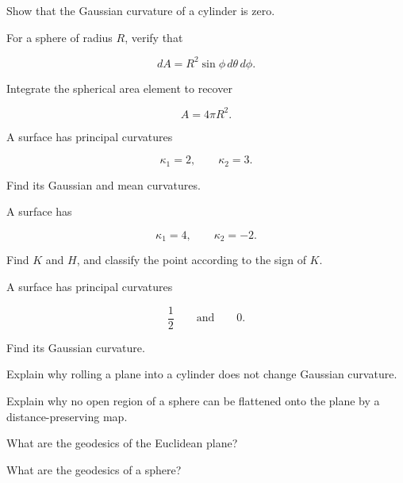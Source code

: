 \begin{exercise}[3]
Show that the Gaussian curvature of a cylinder is zero.
\end{exercise}

\begin{exercise}[2]
For a sphere of radius \(R\), verify that

\[
dA
=
R^2\sin\phi\,d\theta\,d\phi.
\]
\end{exercise}

\begin{exercise}[2]
Integrate the spherical area element to recover

\[
A=4\pi R^2.
\]
\end{exercise}

\begin{exercise}[2]
A surface has principal curvatures

\[
\kappa_1=2,
\qquad
\kappa_2=3.
\]

Find its Gaussian and mean curvatures.
\end{exercise}

\begin{exercise}[2]
A surface has

\[
\kappa_1=4,
\qquad
\kappa_2=-2.
\]

Find \(K\) and \(H\), and classify the point according to the sign of \(K\).
\end{exercise}

\begin{exercise}[2]
A surface has principal curvatures

\[
\frac12
\qquad\text{and}\qquad
0.
\]

Find its Gaussian curvature.
\end{exercise}

\begin{exercise}[3]
Explain why rolling a plane into a cylinder does not change Gaussian
curvature.
\end{exercise}

\begin{exercise}[3]
Explain why no open region of a sphere can be flattened onto the plane by a
distance-preserving map.
\end{exercise}

\begin{exercise}[2]
What are the geodesics of the Euclidean plane?
\end{exercise}

\begin{exercise}[2]
What are the geodesics of a sphere?
\end{exercise}

